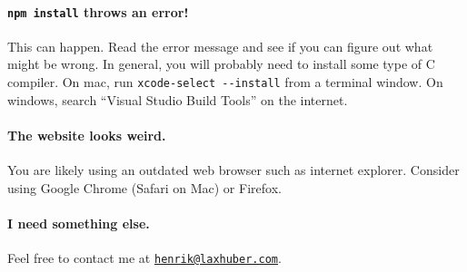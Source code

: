 \documentclass[a4paper,11pt,british,oneside]{article}
\begin{document}
\paragraph{\texttt{npm install} throws an error!}
This can happen. Read the error message and see if you can figure out what might be wrong. In general, you will probably need to install some type of C compiler. On mac, run \verb|xcode-select --install| from a terminal window. On windows, search \enquote{Visual Studio Build Tools} on the internet.

\paragraph{The website looks weird.}
You are likely using an outdated web browser such as internet explorer. Consider using Google Chrome (Safari on Mac) or Firefox.

\paragraph{I need something else.} Feel free to contact me at \href{mailto:henrik@laxhuber.com}{\nolinkurl{henrik@laxhuber.com}}.
\end{document}
